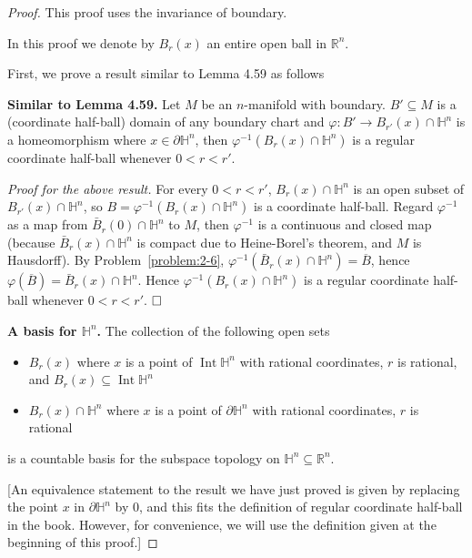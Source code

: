 \begin{proof}
	This proof uses the invariance of boundary.

	In this proof we denote by $B_{r}(x)$ an entire open ball in $\mathbb{R}^{n}$.

	First, we prove a result similar to Lemma 4.59 as follows

	\textbf{Similar to Lemma 4.59.} Let $M$ be an $n$-manifold with boundary. $B'\subseteq M$ is a (coordinate half-ball) domain of any boundary chart and $\varphi: B' \to B_{r'}(x)\cap \mathbb{H}^{n}$ is a homeomorphism where $x \in \partial\mathbb{H}^{n}$, then $\varphi^{-1}(B_{r}(x) \cap \mathbb{H}^{n})$ is a regular coordinate half-ball whenever $0 < r < r'$.

	\textit{Proof for the above result.} For every $0 < r < r'$, $B_{r}(x) \cap \mathbb{H}^{n}$ is an open subset of $B_{r'}(x) \cap \mathbb{H}^{n}$, so $B = \varphi^{-1}(B_{r}(x) \cap \mathbb{H}^{n})$ is a coordinate half-ball. Regard $\varphi^{-1}$ as a map from $\bar{B}_{r}(0) \cap \mathbb{H}^{n}$ to $M$, then $\varphi^{-1}$ is a continuous and closed map (because $\bar{B}_{r}(x) \cap \mathbb{H}^{n}$ is compact due to Heine-Borel's theorem, and $M$ is Hausdorff). By Problem~\ref{problem:2-6}, $\varphi^{-1}(\bar{B}_{r}(x) \cap \mathbb{H}^{n}) = \overline{B}$, hence $\varphi(\overline{B}) = \bar{B}_{r}(x) \cap \mathbb{H}^{n}$. Hence $\varphi^{-1}(B_{r}(x) \cap \mathbb{H}^{n})$ is a regular coordinate half-ball whenever $0 < r < r'$. $\hfill\square$

	\textbf{A basis for $\mathbb{H}^{n}$.} The collection of the following open sets
	\begin{itemize}[itemsep=0pt]
		\item $B_{r}(x)$ where $x$ is a point of $\operatorname{Int}\mathbb{H}^{n}$ with rational coordinates, $r$ is rational, and $B_{r}(x) \subseteq \operatorname{Int}\mathbb{H}^{n}$
		\item $B_{r}(x) \cap \mathbb{H}^{n}$ where $x$ is a point of $\partial\mathbb{H}^{n}$ with rational coordinates, $r$ is rational
	\end{itemize}

	is a countable basis for the subspace topology on $\mathbb{H}^{n} \subseteq \mathbb{R}^{n}$.

		[An equivalence statement to the result we have just proved is given by replacing the point $x$ in $\partial\mathbb{H}^{n}$ by $0$, and this fits the definition of regular coordinate half-ball in the book. However, for convenience, we will use the definition given at the beginning of this proof.]


\end{proof}
